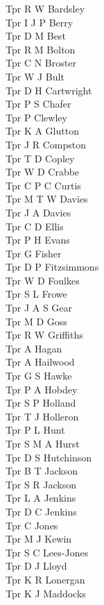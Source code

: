 \begin{multicols}{4}
  Tpr R W Bardsley \\
  Tpr I J P Berry \\
  Tpr D M Best \\
  Tpr R M Bolton \\
  Tpr C N Broster \\
  Tpr W J Bult \\
  Tpr D H Cartwright \\
  Tpr P S Chafer \\
  Tpr P Clewley \\
  Tpr K A Glutton \\
  Tpr J R Compston \\
  Tpr T D Copley \\
  Tpr W D Crabbe \\
  Tpr C P C Curtis \\
  Tpr M T W Davies \\
  Tpr J A Davies \\
  Tpr C D Ellis \\
  Tpr P H Evans \\
  Tpr G Fisher \\
  Tpr D P Fitzsimmons \\
  Tpr W D Foulkes \\
  Tpr S L Frowe \\
  Tpr J A S Gear \\
  Tpr M D Goss \\
  Tpr R W Griffiths \\
  Tpr A Hagan \\
  Tpr A Hailwood \\
  Tpr G S Hawke \\
  Tpr P A Hobdey \\
  Tpr S P Holland \\
  Tpr T J Holleron \\
  Tpr P L Hunt \\
  Tpr S M A Hurst \\
  Tpr D S Hutchinson \\
  Tpr B T Jackson \\
  Tpr S R Jackson \\
  Tpr L A Jenkins \\
  Tpr D C Jenkins \\
  Tpr C Jones \\
  Tpr M J Kewin \\
  Tpr S C Lees-Jones \\
  Tpr D J Lloyd \\
  Tpr K R Lonergan \\
  Tpr K J Maddocks \\

\end{multicols}
